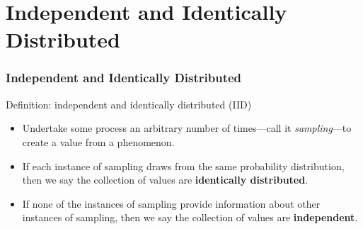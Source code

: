 \documentclass[12pt, block=fill]{beamer}
\begin{document}
\section{Independent and Identically Distributed} 

\begin{frame}
  \frametitle{Independent and Identically Distributed}
  \begin{block}{Definition: independent and identically distributed (IID)}
    \begin{itemize}
    \item Undertake some process an arbitrary number of times—call
      it \textit{sampling}—to create a value from a phenomenon.
    \item If each instance of sampling draws from the same probability
      distribution, then we say the collection of values are
      \textbf{identically distributed}.
    \item If none of the instances of sampling provide information
      about other instances of sampling, then we say the collection of
      values are \textbf{independent}. 
    \end{itemize}
  \end{block}
\end{frame}
\end{document}
